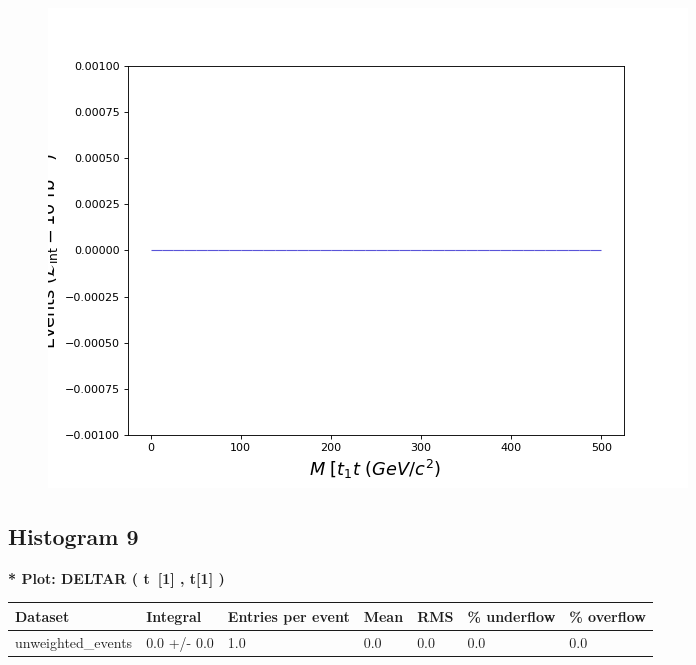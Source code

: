 \documentclass[a4paper, 10pt]{article}
\begin{document}
\begin{figure}[H]
  \begin{center}
    \includegraphics[scale=0.45]{selection_7.png}\\
\caption{   }
  \end{center}
\end{figure}
      \newpage
\subsection{ Histogram 9}

\textbf{* Plot: DELTAR ( t~[1] , t[1] ) }\\
   \begin{table}[H]
  \begin{center}
    \begin{tabular}{|m{23.0mm}|m{23.0mm}|m{18.0mm}|m{19.0mm}|m{19.0mm}|m{19.0mm}|m{19.0mm}|}
      \hline
      {\cellcolor{yellow}         Dataset}& {\cellcolor{yellow}         Integral}& {\cellcolor{yellow}         Entries per event}& {\cellcolor{yellow}         Mean}& {\cellcolor{yellow}         RMS}& {\cellcolor{yellow}         \% underflow}& {\cellcolor{yellow}         \% overflow}\\
      \hline
      {\cellcolor{white}         unweighted\_events}& {\cellcolor{white}         0.0 +/\-- 0.0}& {\cellcolor{white}         1.0}& {\cellcolor{white}         0.0}& {\cellcolor{white}         0.0}& {\cellcolor{green}         0.0}& {\cellcolor{green}         0.0}\\
\hline
    \end{tabular}
  \end{center}
\end{table}
\end{document}
